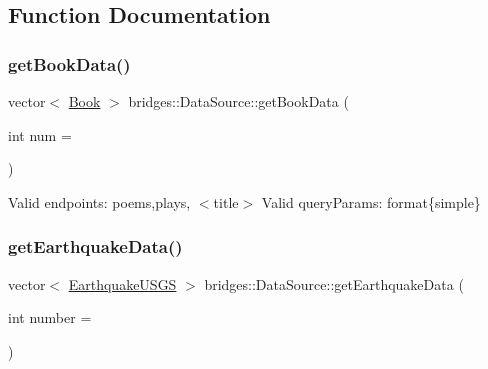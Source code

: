 \subsection{Function Documentation}
\hypertarget{namespacebridges_1_1_data_source_aa7f1de628f3ad3309dbf89bd61108990}{}\label{namespacebridges_1_1_data_source_aa7f1de628f3ad3309dbf89bd61108990} 
\subsubsection{\texorpdfstring{get\+Book\+Data()}{getBookData()}}
{\footnotesize\ttfamily vector$<$ \hyperlink{classbridges_1_1_book}{Book} $>$ bridges\+::\+Data\+Source\+::get\+Book\+Data (\begin{DoxyParamCaption}\item[{int}]{num = {} }\end{DoxyParamCaption})}

Valid endpoints\+: \textquotesingle{}poems\textquotesingle{},\textquotesingle{}plays\textquotesingle{}, $<$title$>$ Valid query\+Params\+: format\{simple\} \hypertarget{namespacebridges_1_1_data_source_a2af96553650d859b102f179b3db55389}{}\label{namespacebridges_1_1_data_source_a2af96553650d859b102f179b3db55389} 
\subsubsection{\texorpdfstring{get\+Earthquake\+Data()}{getEarthquakeData()}}
{\footnotesize\ttfamily vector$<$ \hyperlink{classbridges_1_1_earthquake_u_s_g_s}{Earthquake\+U\+S\+GS} $>$ bridges\+::\+Data\+Source\+::get\+Earthquake\+Data (\begin{DoxyParamCaption}\item[{int}]{number = {} }\end{DoxyParamCaption})}

\hypertarget{namespacebridges_1_1_data_source_a96a28cc7f2a6013fe09b07cc53c7432f}{}\label{namespacebridges_1_1_data_source_a96a28cc7f2a6013fe09b07cc53c7432f} 
